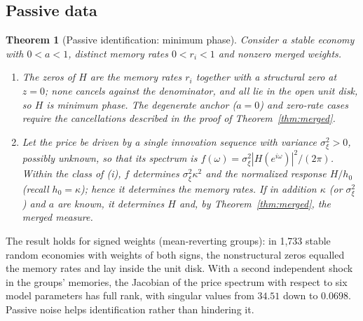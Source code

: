 \documentclass[12pt]{article}
\newtheorem{theorem}{Theorem}[section]
\theoremstyle{definition}
\theoremstyle{remark}
\begin{document}
\subsection{Passive data}

\begin{theorem}[Passive identification: minimum phase]\label{thm:minphase}
Consider a stable economy with $0<a<1$, distinct memory rates $0<r_i<1$ and nonzero merged weights.
\begin{enumerate}[label=(\roman*)]
\item The zeros of $H$ are the memory rates $r_i$ together with a structural zero at $z=0$; none cancels against the denominator, and all lie in the open unit disk, so $H$ is minimum phase. The degenerate anchor ($a=0$) and zero-rate cases require the cancellations described in the proof of Theorem~\ref{thm:merged}.
\item Let the price be driven by a single innovation sequence with variance $\sigma_\xi^2>0$, possibly unknown, so that its spectrum is $f(\omega)=\sigma_\xi^2|H(e^{i\omega})|^2/(2\pi)$. Within the class of (i), $f$ determines $\sigma_\xi^2\kappa^2$ and the normalized response $H/h_0$ (recall $h_0=\kappa$); hence it determines the memory rates. If in addition $\kappa$ (or $\sigma_\xi^2$) and $a$ are known, it determines $H$ and, by Theorem~\ref{thm:merged}, the merged measure.
\end{enumerate}
\end{theorem}


The result holds for signed weights (mean-reverting groups): in 1,733 stable random economies with weights of both signs, the nonstructural zeros equalled the memory rates and lay inside the unit disk. With a second independent shock in the groups' memories, the Jacobian of the price spectrum with respect to six model parameters has full rank, with singular values from $34.51$ down to $0.0698$. Passive noise helps identification rather than hindering it.
\end{document}

